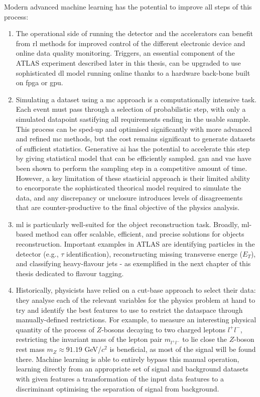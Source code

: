 Modern advanced machine learning has the potential to improve all steps of this process:
\begin{enumerate}
    \item The operational side of running the detector and the accelerators can benefit from \gls{rl} methods for improved control of the different electronic device and online data quality monitoring. Triggers, an essential component of the ATLAS experiment described later in this thesis, can be upgraded to use sophisticated \gls{dl} model running online thanks to a hardware back-bone built on \gls{fpga} or \gls{gpu}.
    \item Simulating a dataset using a \gls{mc} approach is a computationally intensive task. Each event must pass through a selection of probabilistic step, with only a simulated datapoint sastifying all requirements ending in the usable sample. This process can be sped-up and optimised significantly with more advanced and refined \gls{mc} methods, but the cost remains significant to generate datasets of sufficient statistics. Generative \gls{ai} has the potential to accelerate this step by giving statistical model that can be efficiently sampled. \gls{gan} and \gls{vae} have been shown to perform the sampling step in a competitive amount of time. However, a key limitation of these stasticial approach is their limited ability to encorporate the sophisticated theorical model required to simulate the data, and any discrepancy or unclosure introduces levels of disagreements that are counter-productive to the final objective of the physics analysis.
    \item \gls{ml} is particularly well-suited for the object reconstruction task. Broadly, \gls{ml}-based method can offer scalable, efficient, and precise solutions for objects reconstruction. Important examples in ATLAS are identifying particles in the detector (e.g., $\tau$ identification), reconstructing missing transverse energe ($E_T$), and classifying heavy-flavour jets - as exemplified in the next chapter of this thesis dedicated to flavour tagging. %
    \item Historically, physicists have relied on a cut-base approach to select their data: they analyse each of the relevant variables for the physics problem at hand to try and identify the best features to use to restrict the dataspace through manually-defined restrictions. For example, to measure an interesting physical quantity of the process of $Z$-bosons decaying to two charged leptons $l^+l^-$, restricting the invariant mass of the lepton pair $m_{l^+l^-}$ to lie close the $Z$-boson rest mass $m_Z \approx 91.19$ GeV/$c^2$ is beneficial, as most of the signal will be found there. Machine learning is able to entirely bypass this manual operation, learning directly from an appropriate set of signal and background datasets with given features a transformation of the input data features to a discriminant optimising the separation of signal from background. 

\end{enumerate}
